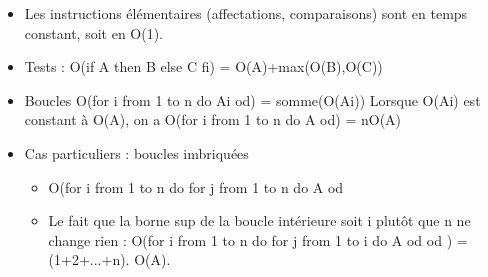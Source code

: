 \begin{multicols}{2}
{\begin{itemize}
\begin{itemize}
		\begin{itemize} 
        \item  Les instructions \'el\'ementaires (affectations,
	comparaisons) sont en temps constant, soit en O(1).
        \item  Tests :
          O(if A then B else C fi) = O(A)+max(O(B),O(C))
        \item  Boucles
          O(for i from 1 to n do Ai od) = somme(O(Ai))
          Lorsque O(Ai) est constant \`a O(A), on a
          O(for i from 1 to n do A od) = nO(A)
        \item  Cas particuliers : boucles imbriqu\'ees
			 \begin{itemize} 
             \item  O(for i from 1 to n do
               for j from 1 to n do A od

             \item  Le fait que la borne sup de la boucle int\'erieure soit i
               plut\^ot que n ne change rien :
               O(for i from 1 to n
               do
          for j from 1 to i do A od
          od ) = (1+2+...+n). O(A).
		  \end{itemize} 
       \end{itemize} 
\end{itemize} 
\end{itemize} 
}\end{multicols}
